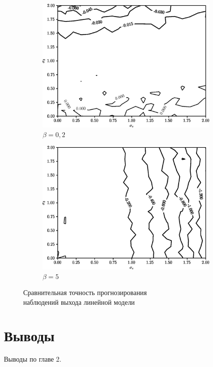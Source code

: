 \begin{figure}[h]
  \begin{subfigure}[b]{\linewidth}
    \centering
    \includegraphics[width=135mm]{fig/linear/predict/beta-0,2_predict-measured.png}
    \caption{\( \beta = 0{,}2 \)}
  \end{subfigure}

  \vspace{2\baselineskip}
  \begin{subfigure}[b]{\linewidth}
    \centering
    \includegraphics[width=135mm]{fig/linear/predict/beta-5_predict-measured.png}
    \caption{\( \beta = 5 \)}
  \end{subfigure}

  \vspace{\baselineskip}
  \caption{%
    Сравнительная точность прогнозирования \\
    наблюдений выхода линейной модели
  }\label{fig:comparison_linear_predict}
\end{figure}

\section{Выводы}

Выводы по главе 2.